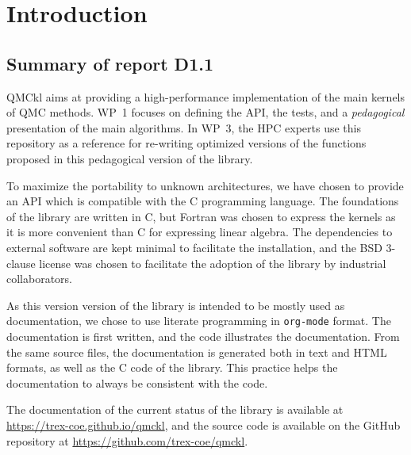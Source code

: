 \newcommand{\orgmode}{\texttt{org-mode}}
\newcommand{\Makefile}{\texttt{Makefile}}
\newcommand{\context}{\texttt{context}}
\newcommand{\CC}{C\nolinebreak\hspace{-.05em}\raisebox{.4ex}{\tiny\bf +}\nolinebreak\hspace{-.10em}\raisebox{.4ex}{\tiny\bf +}}
\def\CC{{C\nolinebreak[4]\hspace{-.05em}\raisebox{.4ex}{\tiny\bf ++}}}

\section{Introduction}

\subsection{Summary of report D1.1}

\Ac{QMCkl} aims at providing a high-performance
implementation of the main kernels of \ac{QMC} methods. 
\ac{WP}~1 focuses on defining the \ac{API}, the tests,
and a \emph{pedagogical} presentation of the main algorithms.
In \ac{WP}~3, the \ac{HPC} experts use this repository as a reference for re-writing
optimized versions of the functions proposed in this pedagogical version of the library.

To maximize the portability to unknown architectures, we have chosen to provide an \ac{API} which
is compatible with the C programming language. The foundations of the library are written in C, but Fortran
was chosen to express the kernels as it is more convenient than C for expressing linear algebra.
The dependencies to external software are kept minimal to facilitate the installation, and the
BSD 3-clause license was chosen to facilitate the adoption of the library by industrial 
collaborators.

As this version version of the library is intended to be mostly used as documentation, 
we chose to use literate programming\cite{knuth_1992} in {\orgmode}
format.\cite{schulte_2012,orgmode} The documentation
is first written, and the code illustrates the documentation. From the same source files,
the documentation is generated both in text and HTML formats, as well as the C code of the library.
This practice helps the documentation to always be consistent with the code.

The documentation of the current status of the library is available
at \url{https://trex-coe.github.io/qmckl}, and the source code is
available on the GitHub repository at \url{https://github.com/trex-coe/qmckl}.

